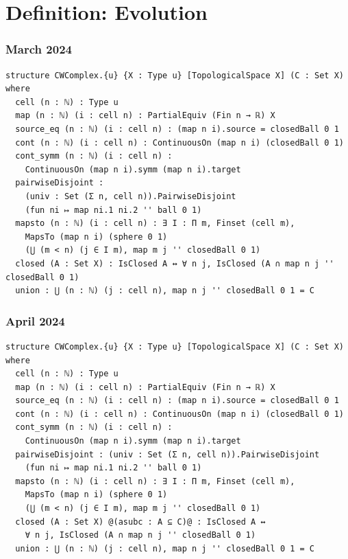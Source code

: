 \documentclass{beamer}
\begin{document}
\section{Definition: Evolution}

\begin{frame}[fragile]
\frametitle{March 2024}
\begin{lstlisting}[basicstyle=\ttfamily\scriptsize]
structure CWComplex.{u} {X : Type u} [TopologicalSpace X] (C : Set X) where
  cell (n : ℕ) : Type u
  map (n : ℕ) (i : cell n) : PartialEquiv (Fin n → ℝ) X
  source_eq (n : ℕ) (i : cell n) : (map n i).source = closedBall 0 1
  cont (n : ℕ) (i : cell n) : ContinuousOn (map n i) (closedBall 0 1)
  cont_symm (n : ℕ) (i : cell n) : 
    ContinuousOn (map n i).symm (map n i).target
  pairwiseDisjoint :
    (univ : Set (Σ n, cell n)).PairwiseDisjoint 
    (fun ni ↦ map ni.1 ni.2 '' ball 0 1)
  mapsto (n : ℕ) (i : cell n) : ∃ I : Π m, Finset (cell m),
    MapsTo (map n i) (sphere 0 1) 
    (⋃ (m < n) (j ∈ I m), map m j '' closedBall 0 1)
  closed (A : Set X) : IsClosed A ↔ ∀ n j, IsClosed (A ∩ map n j '' closedBall 0 1)
  union : ⋃ (n : ℕ) (j : cell n), map n j '' closedBall 0 1 = C
\end{lstlisting}
\end{frame}

\begin{frame}[fragile]
\frametitle{April 2024}
\begin{lstlisting}[basicstyle=\ttfamily\scriptsize]
structure CWComplex.{u} {X : Type u} [TopologicalSpace X] (C : Set X) where
  cell (n : ℕ) : Type u
  map (n : ℕ) (i : cell n) : PartialEquiv (Fin n → ℝ) X
  source_eq (n : ℕ) (i : cell n) : (map n i).source = closedBall 0 1
  cont (n : ℕ) (i : cell n) : ContinuousOn (map n i) (closedBall 0 1)
  cont_symm (n : ℕ) (i : cell n) : 
    ContinuousOn (map n i).symm (map n i).target
  pairwiseDisjoint : (univ : Set (Σ n, cell n)).PairwiseDisjoint 
    (fun ni ↦ map ni.1 ni.2 '' ball 0 1)
  mapsto (n : ℕ) (i : cell n) : ∃ I : Π m, Finset (cell m),
    MapsTo (map n i) (sphere 0 1) 
    (⋃ (m < n) (j ∈ I m), map m j '' closedBall 0 1)
  closed (A : Set X) @(asubc : A ⊆ C)@ : IsClosed A ↔ 
    ∀ n j, IsClosed (A ∩ map n j '' closedBall 0 1)
  union : ⋃ (n : ℕ) (j : cell n), map n j '' closedBall 0 1 = C
\end{lstlisting}
\end{frame}
\end{document}
